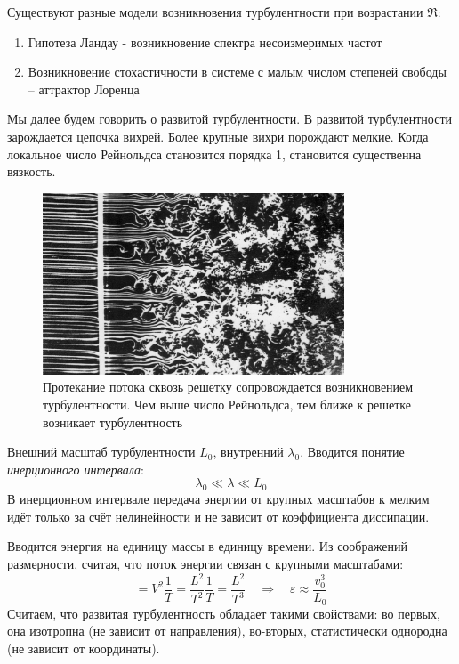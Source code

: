 Существуют разные модели возникновения турбулентности при возрастании $\Re$:
\begin{enumerate}
	\item Гипотеза Ландау  - возникновение спектра несоизмеримых частот
	\item Возникновение стохастичности в системе с малым числом степеней свободы – аттрактор Лоренца
\end{enumerate}

Мы далее будем говорить о развитой турбулентности.  В развитой турбулентности зарождается цепочка вихрей. Более крупные
вихри порождают мелкие. Когда локальное число Рейнольдса становится порядка 1, становится существенна вязкость.

\begin{figure}[H]
	\centering
	\includegraphics[width=0.8\textwidth]{photo/reshetka1.png}
	\caption{Протекание потока сквозь решетку сопровождается возникновением турбулентности. Чем выше число Рейнольдса, тем ближе к решетке возникает турбулентность}
	\label{fig:obtekanie}
\end{figure}

Внешний масштаб турбулентности $L_0$, внутренний $\lambda_0$.
Вводится понятие \textit{инерционного интервала}:
\begin{equation}
    \lambda_0 \ll \lambda \ll L_0
\end{equation}
В инерционном интервале передача энергии от крупных масштабов к
мелким идёт только за счёт нелинейности и не зависит от коэффициента
диссипации.

Вводится энергия на единицу массы в единицу времени. Из соображений
размерности, считая, что поток энергии связан с крупными масштабами:
\begin{equation}
    [\varepsilon] = V^2 \frac{1}{T} = \frac{L^2}{T^2}\frac{1}{T}=
    \frac{L^2}{T^3} 
    \quad\Rightarrow\quad 
    \varepsilon \approx \frac{v_0^3}{L_0}
\end{equation}
Считаем, что развитая турбулентность обладает такими свойствами:
во первых, она изотропна (не зависит от направления), во-вторых, 
статистически однородна (не зависит от координаты).

